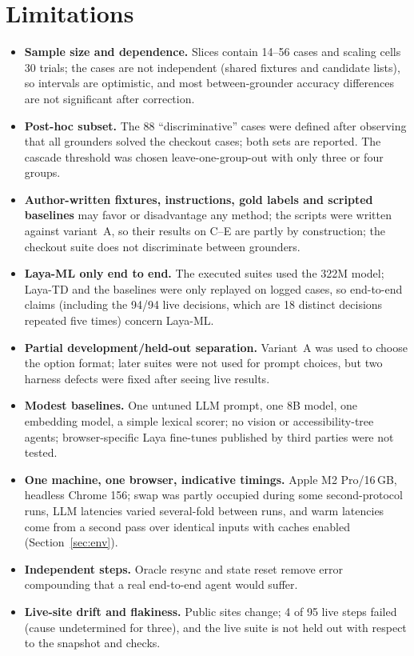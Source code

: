 \documentclass[11pt,a4paper]{article}
\begin{document}
\section{Limitations}\label{sec:limits}
\begin{itemize}\setlength{\itemsep}{1pt}
\item \textbf{Sample size and dependence.} Slices contain 14--56 cases and scaling cells 30 trials; the cases are not independent (shared fixtures and candidate lists), so intervals are optimistic, and most between-grounder accuracy differences are not significant after correction.
\item \textbf{Post-hoc subset.} The 88 ``discriminative'' cases were defined after observing that all grounders solved the checkout cases; both sets are reported. The cascade threshold was chosen leave-one-group-out with only three or four groups.
\item \textbf{Author-written fixtures, instructions, gold labels and scripted baselines} may favor or disadvantage any method; the scripts were written against variant~A, so their results on C--E are partly by construction; the checkout suite does not discriminate between grounders.
\item \textbf{Laya-ML only end to end.} The executed suites used the 322M model; Laya-TD and the baselines were only replayed on logged cases, so end-to-end claims (including the 94/94 live decisions, which are 18 distinct decisions repeated five times) concern Laya-ML.
\item \textbf{Partial development/held-out separation.} Variant~A was used to choose the option format; later suites were not used for prompt choices, but two harness defects were fixed after seeing live results.
\item \textbf{Modest baselines.} One untuned LLM prompt, one 8B model, one embedding model, a simple lexical scorer; no vision or accessibility-tree agents; browser-specific Laya fine-tunes published by third parties were not tested.
\item \textbf{One machine, one browser, indicative timings.} Apple M2 Pro/16\,GB, headless Chrome 156; swap was partly occupied during some second-protocol runs, LLM latencies varied several-fold between runs, and warm latencies come from a second pass over identical inputs with caches enabled (Section~\ref{sec:env}).
\item \textbf{Independent steps.} Oracle resync and state reset remove error compounding that a real end-to-end agent would suffer.
\item \textbf{Live-site drift and flakiness.} Public sites change; 4 of 95 live steps failed (cause undetermined for three), and the live suite is not held out with respect to the snapshot and checks.

\end{itemize}
\end{document}
